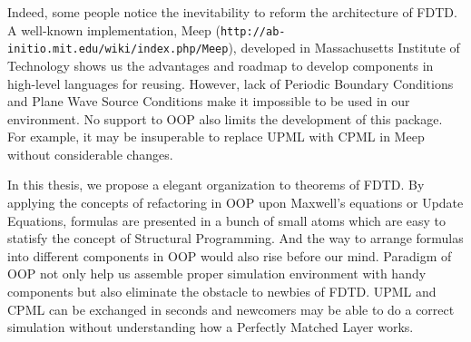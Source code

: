Indeed, some people notice the inevitability to reform the architecture of FDTD. A well-known implementation, Meep
(\texttt{http://ab-initio.mit.edu/wiki/index.php/Meep}), developed in Massachusetts Institute of Technology shows us the
advantages and roadmap to develop components in high-level languages for reusing. However, lack of Periodic Boundary
Conditions and Plane Wave Source Conditions make it impossible to be used in our environment. No support to OOP also
limits the development of this package. For example, it may be insuperable to replace UPML with CPML in Meep without
considerable changes.

In this thesis, we propose a elegant organization to theorems of FDTD. By applying the concepts of refactoring in OOP
upon Maxwell's equations or Update Equations, formulas are presented in a bunch of small atoms which are easy to
statisfy the concept of Structural Programming. And the way to arrange formulas into different components in OOP would
also rise before our mind. Paradigm of OOP not only help us assemble proper simulation environment with handy components
but also eliminate the obstacle to newbies of FDTD. UPML and CPML can be exchanged in seconds and newcomers may be able
to do a correct simulation without understanding how a Perfectly Matched Layer works.
